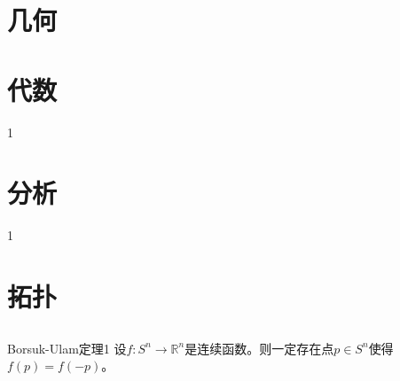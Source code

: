 \documentclass{package/fancy-book}
\begin{document}

\tableofcontents

\quad


\chapter{几何}
\section{}
\begin{proposition}{}
   
\end{proposition}
\chapter{代数}
1
\chapter{分析}
1
\chapter{拓扑}
\section{}
\begin{theorem}{Borsuk-Ulam定理1}
    设$f:S^n \to \mathbb{R}^n$是连续函数。则一定存在点$p \in S^n$使得$f(p)=f(-p)$。
\end{theorem}
\end{document}
